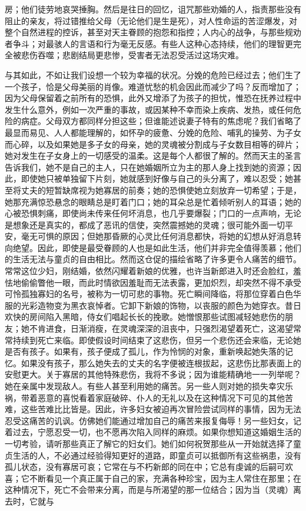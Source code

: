 房；他们徒劳地哀哭捶胸。然后是往日的回忆，诅咒那些劝婚的人，指责那些没有阻止的亲友，将过错推给父母（无论他们是生是死），对人性命运的苦涩爆发，对整个自然进程的控诉，甚至对天主眷顾的抱怨和指控；人内心的战争，与那些规劝者争斗；对最骇人的言语和行为毫无反感。有些人这种心态持续，他们的理智更完全被悲伤吞噬；悲剧结局更悲惨，受害者无法忍受活过这场灾难。\par

与其如此，不如让我们设想一个较为幸福的状况。分娩的危险已经过去；他们生了一个孩子，恰是父母美丽的肖像。难道忧愁的机会因此而减少了吗？反而增加了；因为父母保留着之前所有的恐惧，此外又增添了为孩子的担忧，惟恐在抚养过程中发生什么意外，例如一次严重的事故，或因某种不幸而染上疾病、发热，或任何危险的病症。父母双方都同样分担这些；但谁能述说妻子特有的焦虑呢？我们省略了最显而易见、人人都能理解的，如怀孕的疲惫、分娩的危险、哺乳的操劳、为子女而心碎，以及如果她是多子女的母亲，她的灵魂被分割成与子女数目相等的碎片；她对发生在子女身上的一切感受的温柔。这是每个人都很了解的。然而天主的圣言告诉我们，她不是自己的主人，只在她婚姻所立为主的那人身上找到她的资源；因此，即使她只被单独留下片刻，她就感到好像与自己的头分离了，难以忍受；她甚至将丈夫的短暂缺席视为她寡居的前奏；她的恐惧使她立刻放弃一切希望；于是，她那充满惊恐悬念的眼睛总是盯着门口；她的耳朵总是忙着倾听别人的耳语；她的心被恐惧刺痛，即使尚未传来任何坏消息，也几乎要爆裂；门口的一点声响，无论是想象还是真实的，都成了恶讯的信使，突然震撼她的灵魂；很可能外面一切平安，毫无可惧的原因；但她那昏厥的心灵比任何消息都快，将她的幻想从好消息转向绝望。因此，即使是最受眷顾的人也是如此生活，他们并非完全值得羡慕；他们的生活无法与童贞的自由相比。然而这仓促的描绘省略了许多更令人痛苦的细节。常常这位少妇，刚结婚，依然闪耀着新娘的优雅，也许当新郎进入时还会脸红，羞怯地偷偷瞥他一眼，而此时情欲因羞耻而无法表露，更加炽烈，却突然不得不承受可怜孤独寡妇的名号，被称为一切可悲的事物。死亡瞬间降临，将那位穿着白色华服的光彩造物变为黑衣哀悼者。它卸下新娘的饰物，以丧服的颜色为她穿衣。昔日欢快的房间陷入黑暗，侍女们唱起长长的挽歌。她憎恨那些试图减轻她悲伤的朋友；她不肯进食，日渐消瘦，在灵魂深深的沮丧中，只强烈渴望着死亡，这渴望常常持续到死亡来临。即使假设时间结束了这悲伤，但另一个悲伤还会来临，无论她是否有孩子。如果有，孩子便成了孤儿，作为怜悯的对象，重新唤起她失落的记忆。如果没有孩子，那么她失去的丈夫的名字便被连根拔起，这悲伤比那表面上的安慰更大。关于寡居的其他特殊悲伤，我将不多说；因为谁能精确地一一列举呢？她在亲属中发现敌人。有些人甚至利用她的痛苦。另一些人则对她的损失幸灾乐祸，带着恶意的喜悦看着家庭破碎、仆人的无礼以及在这种情况下可见的其他苦难，这些苦难比比皆是。因此，许多妇女被迫再次冒险尝试同样的事情，因为无法忍受这痛苦的讥讽。仿佛她们能通过增加自己的痛苦来报复侮辱！另一些妇女，记着过去，宁愿忍受一切，也不愿再次陷入同样的麻烦。如果你想知道这婚姻生活的一切考验，请听那些真正了解它的妇女们。她们如何祝贺那些从一开始就选择了童贞生活的人，不必通过经验得知更好的道路，即童贞可以抵御所有这些祸患，没有孤儿状态，没有寡居可哀；它常在与不朽新郎的同在中；它总有虔诚的后嗣可欢喜；它不断看见一个真正属于自己的家，充满各种珍宝，因为主人常住在那里；在这种情况下，死亡不会带来分离，而是与所渴望的那一位结合；因为当（灵魂）离去时，它就与